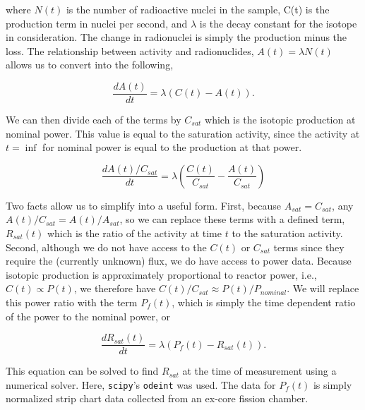 where $N(t)$ is the number of radioactive nuclei in the sample, C(t) is the production term in nuclei per second, and $\lambda$ is the decay constant for the isotope in consideration.
The change in radionuclei is simply the production minus the loss.
The relationship between activity and radionuclides, $A(t) = \lambda N(t)$ allows us to convert  into the following,

\begin{equation}
\label{eqn:bateman_activity}
\frac{dA(t)}{dt} = \lambda (C(t) - A(t)).
\end{equation}

We can then divide each of the terms by $C_{sat}$ which is the isotopic production at nominal power.
This value is equal to the saturation activity, since the activity at $t = \inf$ for nominal power is equal to the production at that power.

\begin{equation}
\label{eqn:bateman_ratios}
\frac{dA(t) / C_{sat}}{dt} = \lambda (\frac{C(t)}{C_{sat}} - \frac{A(t)}{C_{sat}})
\end{equation}

Two facts allow us to simplify  into a useful form.
First, because $A_{sat} = C_{sat}$, any $A(t) / C_{sat} = A(t) / A_{sat}$, so we can replace these terms with a defined term, $R_{sat}(t)$ which is the ratio of the activity at time $t$ to the saturation activity.
Second, although we do not have access to the $C(t)$ or $C_{sat}$ terms since they require the (currently unknown) flux, we do have access to power data.
Because isotopic production is approximately proportional to reactor power, i.e., $C(t) \propto P(t)$, we therefore have $C(t) / C_{sat} \approx P(t) / P_{nominal}$.
We will replace this power ratio with the term $P_{f}(t)$, which is simply the time dependent ratio of the power to the nominal power, or

\begin{equation}
\label{eqn:bateman_r_sat}
\frac{dR_{sat}(t)}{dt} = \lambda (P_{f}(t) - R_{sat}(t)) .
\end{equation}

\noindent
This equation can be solved to find $R_{sat}$ at the time of measurement using a numerical solver.
Here, {\tt scipy}'s {\tt odeint} \cite{jones2001scipy} was used.
The data for $P_{f}(t)$ is simply normalized strip chart data collected from an ex-core fission chamber.

